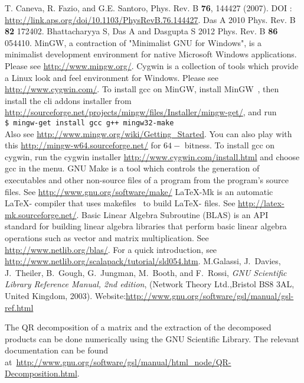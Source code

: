 \documentclass[a4paper,10pt]{article}
\newcommand{\shellcmd}[1]{\\\indent\indent\texttt{\footnotesize\$ #1}\\}
\begin{document}
\begin{thebibliography}{10}
\newblock T. Caneva, R. Fazio, and G.E. Santoro, Phys. Rev. B {\bf 76}, 144427 (2007).
\newblock DOI : \url{http://link.aps.org/doi/10.1103/PhysRevB.76.144427}.
 Das A 2010 {Phys. Rev. B} {\bf 82} 172402. Bhattacharyya S, Das A
and Dasgupta S 2012 {Phys. Rev. B} {\bf 86} 054410.
MinGW, a contraction of "Minimalist GNU for Windows", is a minimalist development environment for native Microsoft Windows applications.
Please see \url{http://www.mingw.org/}.
Cygwin is a collection of tools which provide a Linux look and feel environment for Windows. Please see \url{http://www.cygwin.com/}.
\newblock To install gcc on MinGW, install MinGW~\cite{mingw}, then install the cli addons installer from \url{http://sourceforge.net/projects/mingw/files/Installer/mingw-get/}, and run
\shellcmd{mingw-get install gcc g++ mingw32-make}
Also see \url{http://www.mingw.org/wiki/Getting_Started}. You can also play with this \url{http://mingw-w64.sourceforge.net/} for $64-$ bitness.
\newblock To install gcc on cygwin, run the cygwin installer \url{http://www.cygwin.com/install.html} and choose gcc in the menu. 
GNU Make is a tool which controls the generation of executables and other non-source files of a program from the program's source files. See
\url{http://www.gnu.org/software/make/}
LaTeX-Mk is an automatic \LaTeX - compiler that uses makefiles~\cite{make} to build \LaTeX - files. See \url{http://latex-mk.sourceforge.net/}.
Basic Linear Algebra Subroutine (BLAS) is an API standard for building linear algebra libraries that perform basic linear algebra operations such as vector and matrix multiplication. See \url{http://www.netlib.org/blas/}. For a quick introduction, see \url{http://www.netlib.org/scalapack/tutorial/sld054.htm}.
M.Galassi, J.~Davies, J.~Theiler, B.~Gough, G.~Jungman, M.~Booth, and F.~Rossi, 
{\em GNU Scientific Library Reference Manual,  2nd edition},
(Network Theory Ltd.,Bristol BS8 3AL, United Kingdom, 2003).
\newblock Website:\url{http://www.gnu.org/software/gsl/manual/gsl-ref.html}

The QR decomposition of a matrix and the extraction of the decomposed products can be done numerically using the GNU Scientific Library. The relevant documentation can be found at~\url{http://www.gnu.org/software/gsl/manual/html_node/QR-Decomposition.html}.



\end{thebibliography}
\end{document}
